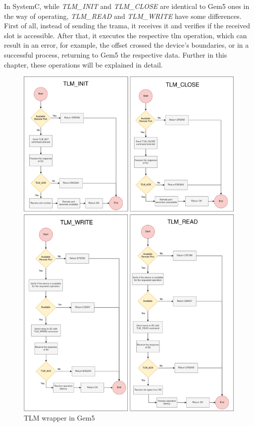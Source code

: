 In SystemC, while \textit{TLM\_INIT} and \textit{TLM\_CLOSE} are identical to Gem5 ones in the way of operating, \textit{TLM\_READ} and 
\textit{TLM\_WRITE} have some differences. First of all, instead of sending the trama, it receives it and verifies if the received slot is accessible.
After that, it executes the respective \gls{tlm} operation, which can result in an error, for example, 
the offset crossed the device's boundaries, or in a successful process, returning to Gem5 the respective data. Further in this chapter, these 
operations will be explained in detail. 


\begin{figure}[H]
	\centering
 	\includegraphics[width=0.8\linewidth]{Images/TLMWrapper_Gem5.png} 
 	\caption{TLM wrapper in Gem5}
\end{figure}

